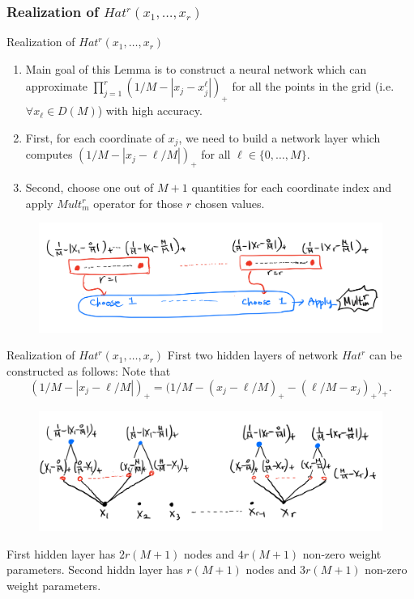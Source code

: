 \documentclass{if-beamer}
\begin{document}
\subsubsection{Realization of $Hat^{r}(x_{1},\dots,x_{r})$}
\begin{frame}{Realization of $Hat^{r}(x_{1},\dots,x_{r})$}
\begin{enumerate}
    \item Main goal of this Lemma is to construct a neural network which can approximate $\prod_{j=1}^{r}(1/M - |x_{j}-x_{j}^{\ell}|)_{+}$ for all the points in the grid (i.e. $\forall x_{\ell}\in D(M)$) with high accuracy.
    
    \item First, for each coordinate of $x_{j}$, we need to build a network layer which computes $(1/M - |x_{j}-\ell/M|)_{+}$ for all $\ell\in\{0,\dots,M\}$.
    
    \item Second, choose one out of $M+1$ quantities for each coordinate index and apply $Mult_{m}^{r}$ operator for those $r$ chosen values. 
\end{enumerate}
    \begin{figure}[htbp]
        \includegraphics[width=1\textwidth]{LemmaB2.png}
        \label{fig:figure5}
    \end{figure}
\end{frame}

\begin{frame}{Realization of $Hat^{r}(x_{1},\dots,x_{r})$}
First two hidden layers of network $Hat^{r}$ can be constructed as follows:
Note that 
\begin{equation*}
    (1/M - |x_{j}-\ell/M|)_{+}=\big(1/M-(x_{j}-\ell/M)_{+}-(\ell/M-x_{j})_{+}\big)_{+}.
\end{equation*}

\begin{figure}[htbp]
    \includegraphics[width=1\textwidth]{LemmaB2_1.png}
    \label{fig:figure6}
\end{figure}

First hidden layer has $2r(M+1)$ nodes and $4r(M+1)$ non-zero weight parameters.
Second hiddn layer has $r(M+1)$ nodes and $3r(M+1)$ non-zero weight parameters.
    
\end{frame}
\end{document}

